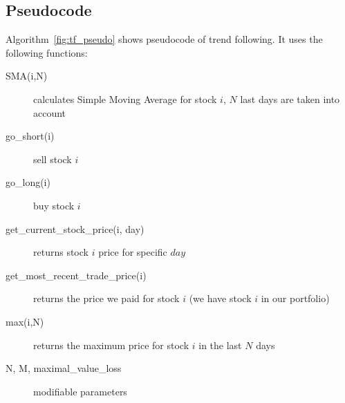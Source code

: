 \subsection{Pseudocode}

Algorithm~\ref{fig:tf_pseudo} shows pseudocode of trend following. It uses the following functions:


\begin{description}

\item[SMA(i,N)]
  calculates Simple Moving Average for stock $i$, $N$ last days are taken into account  
\item[go\_short(i)]
  sell stock $i$
\item[go\_long(i)]
  buy stock $i$
\item[get\_current\_stock\_price(i, day)]
  returns stock $i$ price for specific $day$ 
\item[get\_most\_recent\_trade\_price(i)]
  returns the price we paid for stock $i$ (we have stock $i$ in our portfolio)
\item[max(i,N)]
  returns the maximum price for stock $i$ in the last $N$ days
\item[N, M, maximal\_value\_loss]
  modifiable parameters
\end{description}
% 


% 
% 
% 
% 
% 
% 
% 
% 

